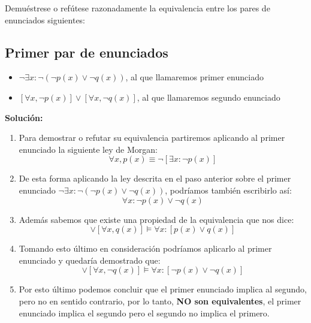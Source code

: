 \documentclass[../main.tex]{subfiles}
\begin{document}
Demuéstrese o refútese razonadamente la equivalencia entre los pares de enunciados siguientes:

\subsection{Primer par de enunciados}
\begin{itemize}
    \item $\neg \exists x : \neg(\neg p(x)\lor \neg q(x))$, al que llamaremos primer enunciado
    \item $[\forall x, \neg p(x)] \lor [\forall x, \neg q(x)]$, al que llamaremos segundo enunciado
\end{itemize}

\bigskip
\textbf{Solución:}

\begin{enumerate}
    \item Para demostrar o refutar su equivalencia partiremos aplicando al primer enunciado la siguiente ley de Morgan:
    \begin{equation*}
        \forall x,  p(x) \equiv \neg [\exists x : \neg p(x)]
    \end{equation*}
    
    \item De esta forma aplicando la ley descrita en el paso anterior sobre el primer enunciado $\neg \exists x : \neg(\neg p(x)\lor \neg q(x))$, podríamos también escribirlo así:
    \begin{equation*}
        \forall x : \neg p(x) \lor \neg q(x)
    \end{equation*}

    \item Además sabemos que existe una propiedad de la equivalencia que nos dice: 
    \begin{equation*}
        [\forall x, p(x)] \lor [\forall x, q(x)] \models \forall x : [p(x) \lor q(x)]
    \end{equation*}
    
    \item Tomando esto último en consideración podríamos aplicarlo al primer enunciado y quedaría demostrado que: 
    \begin{equation*}
        [\forall x, \neg p(x)] \lor [\forall x, \neg q(x)] \models \forall x : [\neg p(x) \lor \neg q(x)]
    \end{equation*}

    \item Por esto último podemos concluir que el primer enunciado implica al segundo, pero no en sentido contrario, por lo tanto, \textbf{NO son equivalentes}, el primer enunciado implica el segundo pero el segundo no implica el primero.
\end{enumerate}
\end{document}
